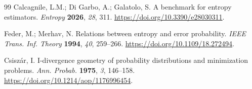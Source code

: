 \documentclass[applsci,supfile,submit,moreauthors]{Definitions/mdpi}
\begin{document}
\begin{thebibliography}{99}
Calcagnile, L.M.; Di Garbo, A.; Galatolo, S. A benchmark for entropy
estimators. \emph{Entropy} \textbf{2026}, \emph{28}, 311.
\url{https://doi.org/10.3390/e28030311}.

Feder, M.; Merhav, N. Relations between entropy and error probability.
\emph{IEEE Trans. Inf. Theory} \textbf{1994}, \emph{40}, 259--266.
\url{https://doi.org/10.1109/18.272494}.

Csisz\'ar, I. I-divergence geometry of probability distributions and
minimization problems. \emph{Ann. Probab.} \textbf{1975}, \emph{3},
146--158. \url{https://doi.org/10.1214/aop/1176996454}.
\end{thebibliography}
\end{document}
